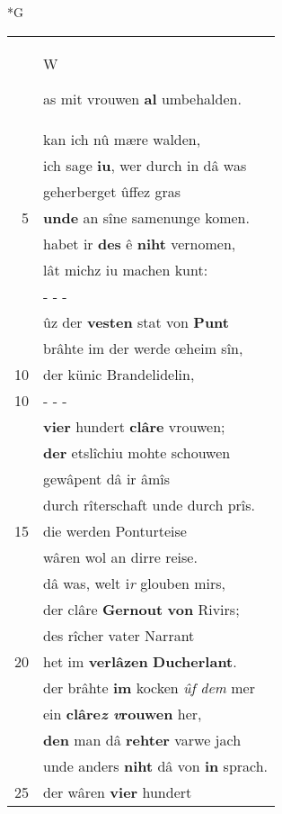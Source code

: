 \documentclass[8pt,a4paper,notitlepage]{article}
\begin{document}
\newpage
\begin{table}[ht]
\begin{minipage}[t]{0.5\linewidth}
\small
\begin{center}*G
\end{center}
\begin{tabular}{rl}
 & \begin{large}W\end{large}as mit vrouwen \textbf{al} umbehalden.\\ 
 & kan ich nû mære walden,\\ 
 & ich sage \textbf{iu}, wer durch in dâ was\\ 
 & geherberget ûffez gras\\ 
5 & \textbf{unde} an sîne samenunge komen.\\ 
 & habet ir \textbf{des} ê \textbf{niht} vernomen,\\ 
 & lât michz iu machen kunt:\\ 
 & \multicolumn{1}{l}{ - - - }\\ 
 & ûz der \textbf{vesten} stat von \textbf{Punt}\\ 
 & brâhte im der werde œheim sîn,\\ 
10 & der künic Brandelidelin,\\ 
10 & \multicolumn{1}{l}{ - - - }\\ 
 & \textbf{vier} hundert \textbf{clâre} vrouwen;\\ 
 & \textbf{der} etslîchiu mohte schouwen\\ 
 & gewâpent dâ ir âmîs\\ 
 & durch rîterschaft unde durch prîs.\\ 
15 & die werden Ponturteise\\ 
 & wâren wol an dirre reise.\\ 
 & dâ was, welt i\textit{r} glouben mirs,\\ 
 & der clâre \textbf{Gernout} \textbf{von} Rivirs;\\ 
 & des rîcher vater Narrant\\ 
20 & het im \textbf{verlâzen} \textbf{Ducherlant}.\\ 
 & der brâhte \textbf{im} kocken \textit{ûf dem} mer\\ 
 & ein \textbf{clâre\textit{z} \textit{v}rouwen} her,\\ 
 & \textbf{den} man dâ \textbf{rehter} varwe jach\\ 
 & unde anders \textbf{niht} dâ von \textbf{in} sprach.\\ 
25 & der wâren \textbf{vier} hundert\\ 

\end{tabular}
\end{minipage}
\end{table}
\end{document}
